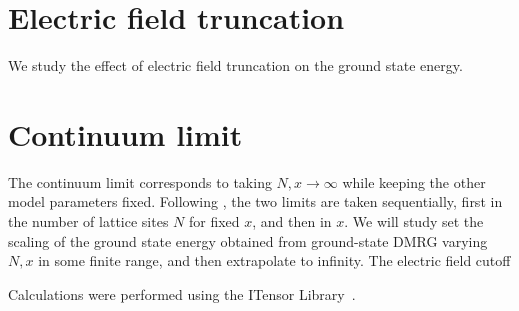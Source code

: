 \documentclass[aps,prl,reprint,superscriptaddress, onecolumn, 11pt]{revtex4-2}
\theoremstyle{definition}
\theoremstyle{definition}
\begin{document}
\section{Electric field truncation}
\label{sec:Etruncation}

We study the effect of electric field truncation on the ground state energy.

\section{Continuum limit}

The continuum limit corresponds to taking $N,x\rightarrow\infty$ while keeping the other model parameters fixed. Following \cite{hamer1982}, the two limits are taken sequentially, first in the number of lattice sites $N$ for fixed $x$, and then in $x$. We will study set the scaling of the ground state energy obtained from ground-state DMRG varying $N,x$ in some finite range, and then extrapolate to infinity. The electric field cutoff

\begin{acknowledgments}
Calculations were performed using the ITensor Library~\cite{itensor}.
\end{acknowledgments}


\end{document}
